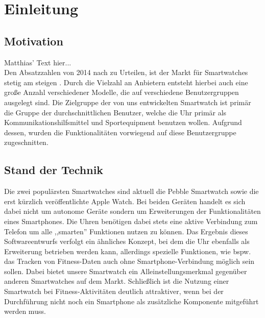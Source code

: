 \chapter{Einleitung}

\section{Motivation}
Matthias' Text hier...\\
Den Absatzzahlen von 2014 nach zu Urteilen, ist der Markt für Smartwatches stetig am steigen . Durch die Vielzahl an Anbietern entsteht hierbei auch eine große Anzahl verschiedener Modelle, die auf verschiedene Benutzergruppen ausgelegt sind. Die Zielgruppe der von uns entwickelten Smartwatch ist primär die Gruppe der durchschnittlichen Benutzer, welche die Uhr primär als Kommunikationshilfsmittel und Sportequipment benutzen wollen. Aufgrund dessen, wurden die Funktionalitäten  vorwiegend auf diese Benutzergruppe zugeschnitten.

\section{Stand der Technik}
Die zwei populärsten Smartwatches sind aktuell die Pebble Smartwatch sowie die erst kürzlich veröffentlichte Apple Watch. Bei beiden Geräten handelt es sich dabei nicht um autonome Geräte sondern um Erweiterungen der Funktionalitäten eines Smartphones. Die Uhren benötigen dabei stets eine aktive Verbindung zum Telefon um alle ,,smarten'' Funktionen nutzen zu können. Das Ergebnis dieses Softwareentwurfs verfolgt ein ähnliches Konzept, bei dem die Uhr ebenfalls als Erweiterung betrieben werden kann, allerdings spezielle Funktionen, wie bspw. das Tracken von Fitness-Daten auch ohne Smartphone-Verbindung möglich sein sollen. Dabei bietet unsere Smartwatch ein Alleinstellungsmerkmal gegenüber anderen Smartwatches auf dem Markt. Schließlich ist die Nutzung einer Smartwatch bei Fitness-Aktivitäten deutlich attraktiver, wenn bei der Durchführung nicht noch ein Smartphone als zusätzliche Komponente mitgeführt werden muss.

